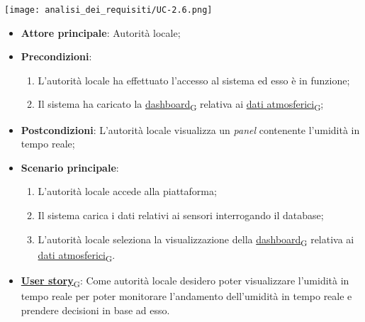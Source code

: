\begin{center}
	\texttt{[image: analisi\_dei\_requisiti/UC-2.6.png]}
\end{center}

\begin{itemize}
	\item \textbf{Attore principale}: Autorità locale;
	\item \textbf{Precondizioni}:
	      \begin{enumerate}
		      \item L'autorità locale ha effettuato l'accesso al sistema ed esso è in funzione;
		      \item Il sistema ha caricato la \href{https://7last.github.io/docs/rtb/documentazione-interna/glossario\#dashboard}{dashboard\textsubscript{G}} relativa ai \href{https://7last.github.io/docs/rtb/documentazione-interna/glossario\#dati-atmosferici}{dati atmosferici\textsubscript{G}};
	      \end{enumerate}
	\item \textbf{Postcondizioni}: L'autorità locale visualizza un \textit{panel} contenente l'umidità in tempo reale;
	\item \textbf{Scenario principale}:
	      \begin{enumerate}
		      \item L'autorità locale accede alla piattaforma;
		      \item Il sistema carica i dati relativi ai sensori interrogando il database;
		      \item L'autorità locale seleziona la visualizzazione della \href{https://7last.github.io/docs/rtb/documentazione-interna/glossario\#dashboard}{dashboard\textsubscript{G}} relativa ai \href{https://7last.github.io/docs/rtb/documentazione-interna/glossario\#dati-atmosferici}{dati atmosferici\textsubscript{G}}.
	      \end{enumerate}
	\item \href{https://7last.github.io/docs/rtb/documentazione-interna/glossario\#user-story}{\textbf{User story}\textsubscript{G}}: Come autorità locale desidero poter visualizzare l'umidità in tempo reale per poter monitorare
	      l'andamento dell'umidità in tempo reale e prendere decisioni in base ad esso.
\end{itemize}

